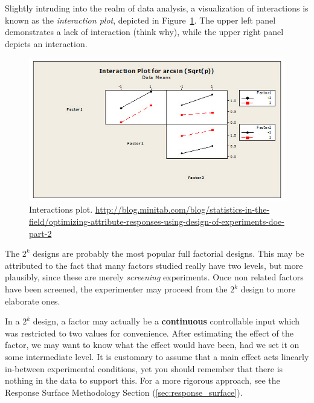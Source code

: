 
Slightly intruding into the realm of data analysis, a visualization of interactions is known as the \emph{interaction plot}, depicted in Figure~\ref{fig:interaction_plot}. 
The upper left panel demonstrates a lack of interaction (think why), while the upper right panel depicts an interaction.
\begin{figure}[ht]
\centering
\includegraphics[width=0.3\textheight]{art/attribute_doe_interaction_plot}
\caption[Interactions plot]{Interactions plot. \newline \url{http://blog.minitab.com/blog/statistics-in-the-field/optimizing-attribute-responses-using-design-of-experiments-doe-part-2}}
\label{fig:interaction_plot}
\end{figure}


\begin{remark}[Popularity of $2^k$]
The $2^k$ designs are probably the most popular full factorial designs. 
This may be attributed to the fact that many factors studied really have two levels, but more plausibly, since these are merely \emph{screening} experiments. 
Once non related factors have been screened, the experimenter may proceed from the $2^k$ design to more elaborate ones. 
\end{remark}



\begin{remark}
In a $2^k$ design, a factor may actually be a \textbf{continuous} controllable input which was restricted to two values for convenience. 
After estimating the effect of the factor, we may want to know what the effect would have been, had we set it on some intermediate level.
It is customary to assume that a main effect acts linearly in-between experimental conditions, yet you should remember that there is nothing in the data to support this.
For a more rigorous approach, see the Response Surface Methodology Section (\ref{sec:response_surface}).
\end{remark}





